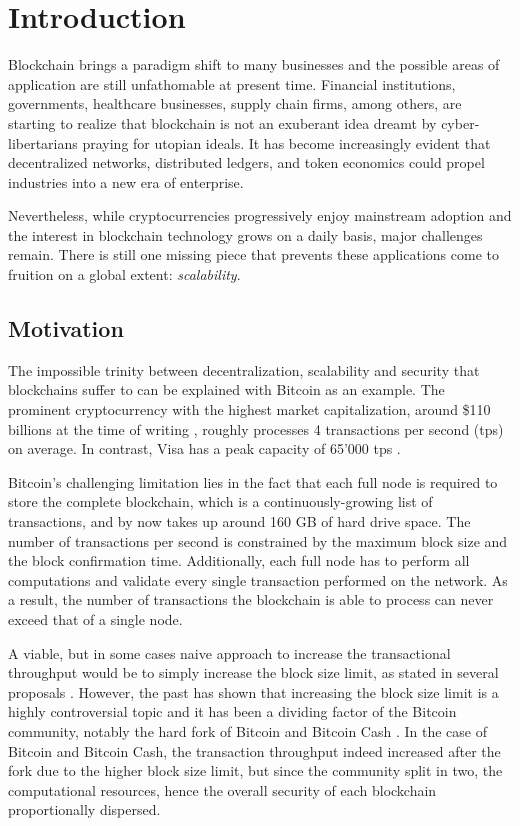 
\chapter{Introduction}

\label{Chapter:Introduction}

Blockchain brings a paradigm shift to many businesses and the possible areas of application are still unfathomable at present time. Financial institutions, governments, healthcare businesses, supply chain firms, among others, are starting to realize that blockchain is not an exuberant idea dreamt by cyber-libertarians praying for utopian ideals. It has become increasingly evident that decentralized networks, distributed ledgers, and token economics could propel industries into a new era of enterprise.

Nevertheless, while cryptocurrencies progressively enjoy mainstream adoption and the interest in blockchain technology grows on a daily basis, major challenges  remain. There is still one missing piece that prevents these applications come to fruition on a global extent: \textit{scalability}.

\section{Motivation}

The impossible trinity between decentralization, scalability and security \parencite{BlockchainTrilemma} that blockchains suffer to can be explained with Bitcoin as an example. The prominent cryptocurrency with the highest market capitalization, around \$110 billions at the time of writing \parencite{BitcoinMarketCap}, roughly processes 4 transactions per second (tps) on average. In contrast, Visa has a peak capacity of 65'000 tps \parencite{VisaFactSheet}. 

Bitcoin's challenging limitation lies in the fact that each full node is required to store the complete blockchain, which is a continuously-growing list of transactions, and by now takes up around 160 GB of hard drive space. The number of transactions per second is constrained by the maximum block size and the block confirmation time. Additionally, each full node has to perform all computations and validate every single transaction performed on the network. As a result, the number of transactions the blockchain is able to process can never exceed that of a single node.

A viable, but in some cases naive approach to increase the transactional throughput would be to simply increase the block size limit, as stated in several proposals \parencites{BIP100, BIP101}. However, the past has shown that increasing the block size limit is a highly controversial topic \parencite{BlockSizeLimitControversy} and it has been a dividing factor of the Bitcoin community, notably the hard fork of Bitcoin and Bitcoin Cash \parencite{BitcoinForkBCH}. In the case of Bitcoin and Bitcoin Cash, the transaction throughput indeed increased after the fork due to the higher block size limit, but since the community split in two, the computational resources, hence the overall security of each blockchain proportionally dispersed.


